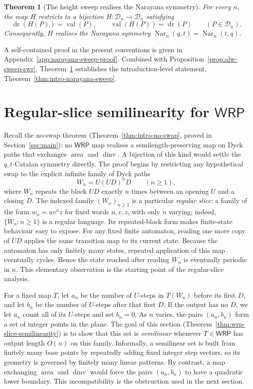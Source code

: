 \documentclass[11pt]{article}
\newtheorem{theorem}{Theorem}[section]
\theoremstyle{definition}
\newcommand{\D}{\mathcal D}
\newcommand{\WRP}{\mathsf{WRP}}
\newcommand{\area}{\operatorname{area}}
\newcommand{\dinv}{\operatorname{dinv}}
\newcommand{\val}{\operatorname{val}}
\newcommand{\dr}{\operatorname{dr}}
\newcommand{\Nar}{\operatorname{Nar}}
\begin{document}
\begin{theorem}[The height sweep realises the Narayana symmetry]
\label{thm:narayana-sweep}
For every $n$, the map $H$ restricts to a bijection
$H\colon\D_n\to\D_n$ satisfying
\[
   \dr(H(P))=\val(P),\qquad \val(H(P))=\dr(P)
   \qquad (P\in\D_n).
\]
Consequently, $H$ realises the Narayana symmetry
$\Nar_n(q,t)=\Nar_n(t,q)$.
\end{theorem}

A self-contained proof in the present conventions is given in
Appendix~\ref{app:narayana-sweep-proof}.  Combined with
Proposition~\ref{prop:alw-sweep-swr}, Theorem~\ref{thm:narayana-sweep}
establishes the introduction-level statement,
Theorem~\ref{thm:intro-narayana-sweep}.

\section[Regular-slice semilinearity for WRP]{Regular-slice semilinearity for $\WRP$}\label{sec:slice-semilinearity}

Recall the no-swap theorem (Theorem~\ref{thm:intro-no-swap}, proved in
Section~\ref{sec:main}): no $\WRP$ map realises a semilength-preserving map on
Dyck paths that exchanges $\area$ and $\dinv$.  A bijection of this kind would settle
the $q,t$-Catalan symmetry directly.  The proof begins by restricting any
hypothetical swap to the explicit infinite family of Dyck paths
\[
   W_n=U(UD)^nD\qquad (n\ge 1),
\]
where $W_n$ repeats the block $UD$ exactly $n$ times between an
opening $U$ and a closing $D$.  The indexed family $(W_n)_{n\ge1}$ is a
particular \emph{regular slice}: a family
of the form $w_n=uv^nz$ for fixed words $u,v,z$, with only $n$ varying;
indeed, $\{W_n:n\ge 1\}$ is a regular language.  Its repeated-block form makes
finite-state behaviour easy to expose.  For any fixed finite automaton, reading
one more copy of $UD$ applies the same transition map to its current state.
Because the automaton has only finitely many states, repeated application of
this map eventually cycles.  Hence the state reached after reading $W_n$ is
eventually periodic in $n$.  This elementary observation is the starting point
of the regular-slice analysis.

For a fixed map $T$, let $a_n$ be the number of $U$-steps in
$T(W_n)$ before its first $D$, and let $b_n$ be the number of $U$-steps after
that first $D$.  If the output has no $D$, we let $a_n$ count all of its
$U$-steps and set $b_n=0$.  As $n$ varies, the pairs $(a_n,b_n)$ form a set of
integer points in the plane.  The goal of this section
(Theorem~\ref{thm:wrp-slice-semilinearity}) is to show that this set is
\emph{semilinear} whenever $T\in\WRP$ has output length $O(n)$ on this family.
Informally, a semilinear set is built from finitely many base points by
repeatedly adding fixed integer step vectors, so its geometry is governed by
finitely many linear patterns.  By contrast, a map exchanging $\area$ and
$\dinv$ would force the pairs $(a_n,b_n)$ to have a quadratic lower boundary.
This incompatibility is the obstruction used in the next section.
\end{document}
